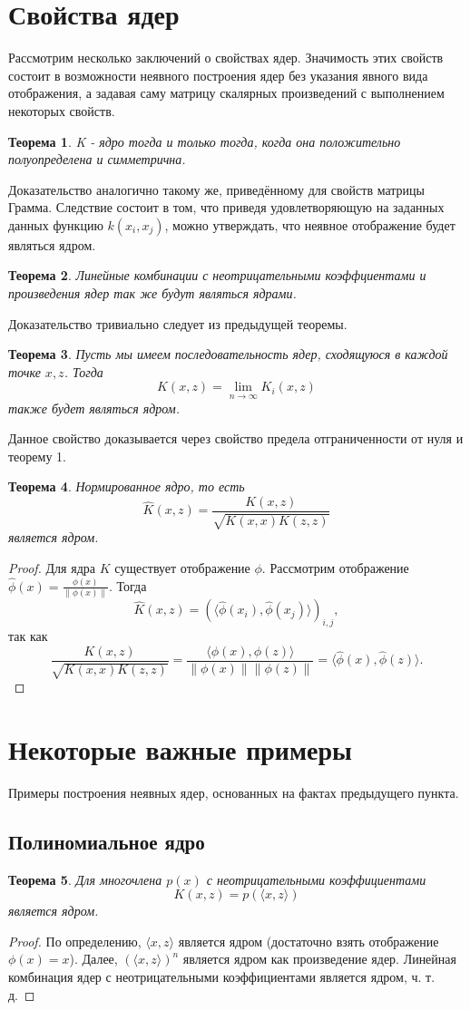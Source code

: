 \documentclass[twoside,twocolumn]{article}
\theoremstyle{plain}
\newtheorem{theorem}{Теорема}
\theoremstyle{definition}
\begin{document}
\section{Свойства ядер}
Рассмотрим несколько заключений о свойствах ядер. Значимость этих свойств состоит в возможности неявного построения ядер без указания явного вида отображения, а задавая саму матрицу скалярных произведений с выполнением некоторых свойств.
\begin{theorem}
K - ядро тогда и только тогда, когда она положительно полуопределена и симметрична.
\end{theorem}
Доказательство аналогично такому же, приведённому для свойств матрицы Грамма. Следствие состоит в том, что приведя удовлетворяющую на заданных данных функцию $k(x_i, x_j)$, можно утверждать, что неявное отображение будет являться ядром.
\begin{theorem}
Линейные комбинации с неотрицательными коэффциентами и произведения ядер так же будут являться ядрами.
\end{theorem}
Доказательство тривиально следует из предыдущей теоремы.
\begin{theorem}
Пусть мы имеем последовательность ядер, сходящуюся в каждой точке $x, z$. Тогда 
\[K(x, z) = \lim_{n \xrightarrow{} \infty} K_i(x, z)\]
также будет являться ядром.
\end{theorem}
Данное свойство доказывается через свойство предела отграниченности от нуля и теорему 1.

\begin{theorem}
Нормированное ядро, то есть
\[\hat{K}(x, z) = \frac{K(x,z)}{\sqrt{K(x, x)K(z, z)}}\]
является ядром.
\end{theorem}
\begin{proof}
Для ядра $K$ существует отображение $\phi$. Рассмотрим отображение $\hat{\phi}(x) = \frac{\phi(x)}{\|\phi(x)\|}$. Тогда
\[\hat{K}(x, z) = (\langle \hat{\phi}(x_i), \hat{\phi}(x_j)\rangle)_{i, j},\] так как
\[\frac{K(x,z)}{\sqrt{K(x, x)K(z, z)}} = \frac{\langle \phi(x), \phi(z) \rangle}{\|\phi(x)\|\|\phi(z)\|} = \langle \hat{\phi}(x), \hat{\phi}(z)\rangle.\]
\end{proof}

\section{Некоторые важные примеры}
Примеры построения неявных ядер, основанных на фактах предыдущего пункта.
\subsection{Полиномиальное ядро}
\begin{theorem}
Для многочлена $p(x)$ с неотрицательными коэффициентами \[K(x, z) = p(\langle x, z\rangle)\] является ядром.
\end{theorem}
\begin{proof}
По определению, $\langle x, z\rangle$ является ядром (достаточно взять отображение $\phi(x) = x$). Далее, $(\langle x, z\rangle)^n$ является ядром как произведение ядер. Линейная комбинация ядер с неотрицательными коэффициентами является ядром, ч. т. д.
\end{proof} 
\end{document}
